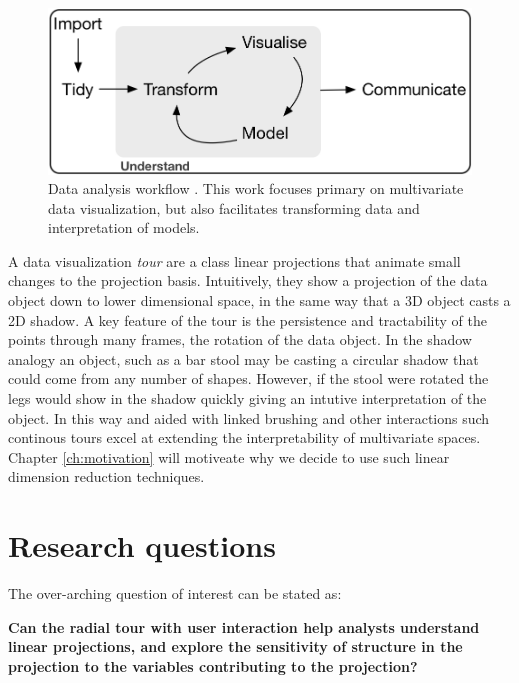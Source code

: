 \documentclass{template/monashthesis}
\begin{document}
\begin{figure}

{\centering \includegraphics[width=1\linewidth,]{./figures/data_analysis_workflow} 

}

\caption{Data analysis workflow \autocite{wickham_r_2017}. This work focuses primary on multivariate data visualization, but also facilitates transforming data and interpretation of models.}\label{fig:dataanalysisworkflow}
\end{figure}

A data visualization \emph{tour} \autocite{cook_grand_2008,lee_review_2021} are a class linear projections that animate small changes to the projection basis. Intuitively, they show a projection of the data object down to lower dimensional space, in the same way that a 3D object casts a 2D shadow. A key feature of the tour is the persistence and tractability of the points through many frames, the rotation of the data object. In the shadow analogy an object, such as a bar stool may be casting a circular shadow that could come from any number of shapes. However, if the stool were rotated the legs would show in the shadow quickly giving an intutive interpretation of the object. In this way and aided with linked brushing and other interactions such continous tours excel at extending the interpretability of multivariate spaces. Chapter \ref{ch:motivation} will motiveate why we decide to use such linear dimension reduction techniques.

\hypertarget{research-questions}{%
\section{Research questions}\label{research-questions}}

The over-arching question of interest can be stated as:

\textbf{Can the radial tour with user interaction help analysts understand linear projections, and explore the sensitivity of structure in the projection to the variables contributing to the projection?}
\end{document}
